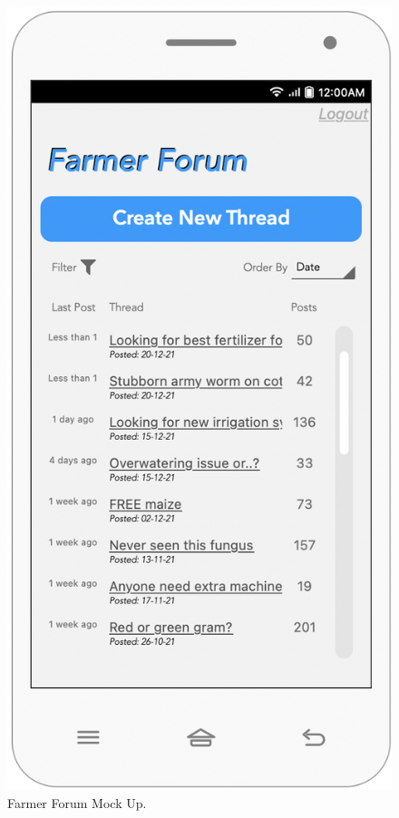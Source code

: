 \begin{multicols}{3}
\begin{figure}[H]
\centering
\includegraphics[scale=0.35]{../images_diagrams/mock_ups/farmerforum100.png}
\caption{\label{fig:mock_forum}Farmer Forum Mock Up.}
\end{figure}



\end{multicols}
